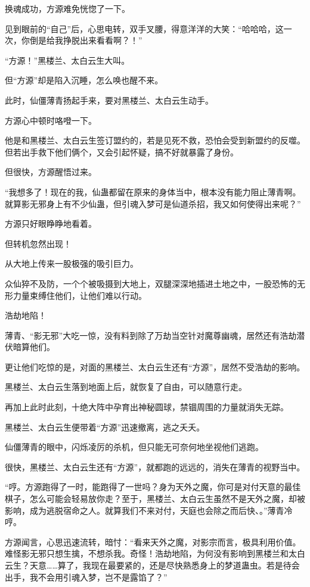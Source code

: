 \begin{this_body}
换魂成功，方源难免恍惚了一下。

见到眼前的“自己”后，心思电转，双手叉腰，得意洋洋的大笑：“哈哈哈，这一次，你倒是给我挣脱出来看看啊？！”

“方源！”黑楼兰、太白云生大叫。

但“方源”却是陷入沉睡，怎么唤也醒不来。

此时，仙僵薄青扬起手来，要对黑楼兰、太白云生动手。

方源心中顿时咯噔一下。

他是和黑楼兰、太白云生签订盟约的，若是见死不救，恐怕会受到新盟约的反噬。但若出手救下他们俩个，又会引起怀疑，搞不好就暴露了身份。

但很快，方源醒悟过来。

“我想多了！现在的我，仙蛊都留在原来的身体当中，根本没有能力阻止薄青啊。就算影无邪身上有不少仙蛊，但引魂入梦可是仙道杀招，我又如何使得出来呢？”

方源只好眼睁睁地看着。

但转机忽然出现！

从大地上传来一股极强的吸引巨力。

众仙猝不及防，一个个被吸摄到大地上，双腿深深地插进土地之中，一股恐怖的无形力量束缚住他们，让他们难以行动。

浩劫地陷！

薄青、“影无邪”大吃一惊，没有料到除了万劫当空针对魔尊幽魂，居然还有浩劫潜伏暗算他们。

更让他们吃惊的是，对面的黑楼兰、太白云生还有“方源”，居然不受浩劫的影响。

黑楼兰、太白云生落到地面上后，就恢复了自由，可以随意行走。

再加上此时此刻，十绝大阵中孕育出神秘圆球，禁锢周围的力量就消失无踪。

黑楼兰、太白云生便带着“方源”迅速撤离，逃之夭夭。

仙僵薄青的眼中，闪烁凌厉的杀机，但只能无可奈何地坐视他们逃跑。

很快，黑楼兰、太白云生还有“方源”，就都跑的远远的，消失在薄青的视野当中。

“哼。方源跑得了一时，能跑得了一世吗？身为天外之魔，你可是对付天意的最佳棋子，怎么可能会轻易放你走？至于，黑楼兰、太白云生虽然不是天外之魔，却被影响，成为逃脱宿命之人。就算我们不来对付，天庭也会除之而后快、。”薄青冷哼。

方源闻言，心思迅速流转，暗忖：“看来天外之魔，对影宗而言，极具利用价值。难怪影无邪只想生擒，不想杀我。奇怪！浩劫地陷，为何没有影响到黑楼兰和太白云生？天意……算了，我现在最要紧的，还是尽快熟悉身上的梦道蛊虫。若是待会出手，我不会用引魂入梦，岂不是露馅了？”


\end{this_body}
